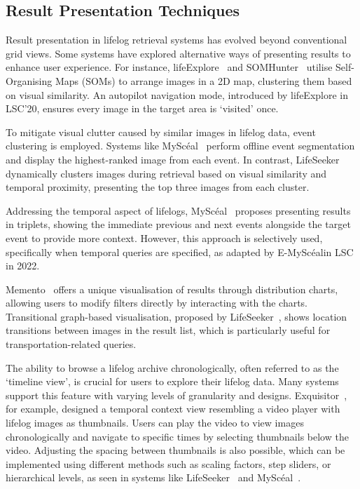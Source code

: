 \documentclass[11pt]{article}
\newcommand{\mysceal}{MySc{\'e}al}
\begin{document}
\subsection{Result Presentation Techniques}
Result presentation in lifelog retrieval systems has evolved beyond conventional grid views. Some systems have explored alternative ways of presenting results to enhance user experience. For instance, lifeExplore~\cite{schoeffmann2023lifexplore} and SOMHunter~\cite{lokovc2021enhanced} utilise Self-Organising Maps (SOMs) to arrange images in a 2D map, clustering them based on visual similarity. An autopilot navigation mode, introduced by lifeExplore in LSC'20, ensures every image in the target area is `visited' once. 

To mitigate visual clutter caused by similar images in lifelog data, event clustering is employed. Systems like \mysceal~\cite{emysceal2022} perform offline event segmentation and display the highest-ranked image from each event. In contrast, LifeSeeker~\cite{nguyen2023lifeseeker} dynamically clusters images during retrieval based on visual similarity and temporal proximity, presenting the top three images from each cluster. 

Addressing the temporal aspect of lifelogs, \mysceal~\cite{emysceal2022} proposes presenting results in triplets, showing the immediate previous and next events alongside the target event to provide more context. However, this approach is selectively used, specifically when temporal queries are specified, as adapted by E-\mysceal in LSC in 2022.

Memento~\cite{alam2023memento} offers a unique visualisation of results through distribution charts, allowing users to modify filters directly by interacting with the charts. Transitional graph-based visualisation, proposed by LifeSeeker~\cite{nguyen2023lifeseeker}, shows location transitions between images in the result list, which is particularly useful for transportation-related queries.

The ability to browse a lifelog archive chronologically, often referred to as the `timeline view', is crucial for users to explore their lifelog data. Many systems support this feature with varying levels of granularity and designs. Exquisitor~\cite{khan2021exquisitor}, for example, designed a temporal context view resembling a video player with lifelog images as thumbnails. Users can play the video to view images chronologically and navigate to specific times by selecting thumbnails below the video. Adjusting the spacing between thumbnails is also possible, which can be implemented using different methods such as scaling factors, step sliders, or hierarchical levels, as seen in systems like LifeSeeker~\cite{nguyen2023lifeseeker} and \mysceal~\cite{emysceal2022}.
\end{document}
